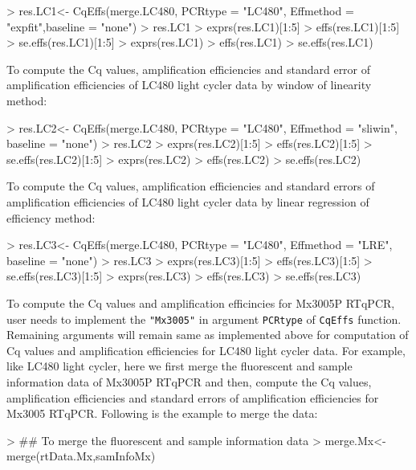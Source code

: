 \documentclass[11pt]{article}
\newcommand{\code}[1]{{\tt #1}}
\begin{document}
\begin{Schunk}
\begin{Sinput}
> res.LC1<- CqEffs(merge.LC480, PCRtype = "LC480", Effmethod = "expfit",baseline = "none")
> res.LC1 
> exprs(res.LC1)[1:5] 
> effs(res.LC1)[1:5] 
> se.effs(res.LC1)[1:5]
> exprs(res.LC1) 
> effs(res.LC1)
> se.effs(res.LC1)
\end{Sinput}
\end{Schunk}

To compute the Cq values, amplification efficiencies and standard error of amplification efficiencies of LC480 light cycler data by window of linearity method:

\begin{Schunk}
\begin{Sinput}
> res.LC2<- CqEffs(merge.LC480, PCRtype = "LC480", Effmethod = "sliwin", baseline = "none")
> res.LC2
> exprs(res.LC2)[1:5] 
> effs(res.LC2)[1:5] 
> se.effs(res.LC2)[1:5] 
> exprs(res.LC2) 
> effs(res.LC2)
> se.effs(res.LC2)
\end{Sinput}
\end{Schunk}

To compute the Cq values, amplification efficiencies and standard errors of amplification efficiencies of LC480 light cycler data by linear regression of efficiency method:

\begin{Schunk}
\begin{Sinput}
> res.LC3<- CqEffs(merge.LC480, PCRtype = "LC480", Effmethod = "LRE", baseline = "none")
> res.LC3 
> exprs(res.LC3)[1:5] 
> effs(res.LC3)[1:5] 
> se.effs(res.LC3)[1:5] 
> exprs(res.LC3) 
> effs(res.LC3)
> se.effs(res.LC3)
\end{Sinput}
\end{Schunk}

To compute the Cq values and amplification efficincies for Mx3005P RTqPCR, user needs to implement the
\code{"Mx3005"} in argument \code{PCRtype} of \code{CqEffs} function. Remaining arguments will remain same
as implemented above for computation of Cq values and amplification efficiencies for LC480 light cycler data.
For example, like LC480 light cycler, here we first merge the fluorescent and sample information data of Mx3005P RTqPCR and then, compute the Cq values, amplification efficiencies and standard errors of amplification efficiencies for Mx3005 RTqPCR. Following is the example to merge the data:

\begin{Schunk}
\begin{Sinput}
> ## To merge the fluorescent and sample information data
> merge.Mx<-merge(rtData.Mx,samInfoMx) 
\end{Sinput}
\end{Schunk}
\end{document}
